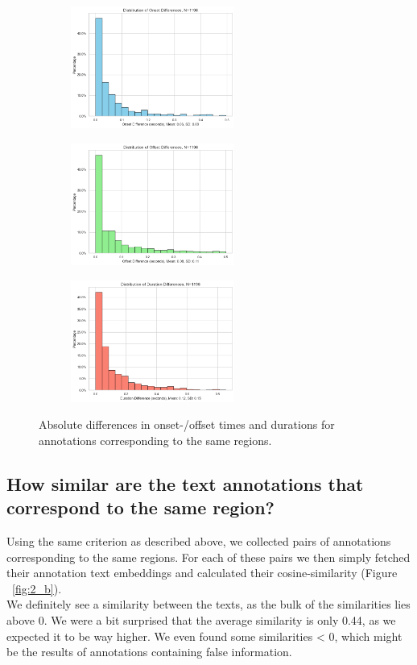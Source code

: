 \begin{figure}[htbp]
  \centering
  \begin{subfigure}[b]{0.33\textwidth}
    \includegraphics[width=\textwidth, height=4cm]{figs/onset_diffs.png}
  \end{subfigure}
  \hfill
  \begin{subfigure}[b]{0.33\textwidth}
    \includegraphics[width=\textwidth, height=4cm]{figs/offset_diffs.png}
  \end{subfigure}
  \hfill
  \begin{subfigure}[b]{0.33\textwidth}
    \includegraphics[width=\textwidth, height=4cm]{figs/duration_diffs.png}
  \end{subfigure}
  \caption{Absolute differences in onset-/offset times and durations for annotations corresponding to the same regions.}
  \label{fig:2_a}
\end{figure}

\subsection{How similar are the text annotations that correspond to the same region?}
\label{sec:Annotation Quality:b1}
Using the same criterion as described above, we collected pairs of annotations corresponding to the same regions. For each of these pairs we then simply fetched their annotation text embeddings and calculated their cosine-similarity (Figure ~\ref{fig:2_b}). \\
We definitely see a similarity between the texts, as the bulk of the similarities lies above 0. We were a bit surprised that the average similarity is only 0.44, as we expected it to be way higher. We even found some similarities < 0, which might be the results of annotations containing false information.

